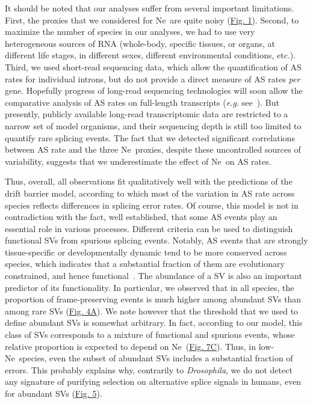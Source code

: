It should be noted that our analyses suffer from several important limitations. First, the proxies that we considered for \acrshort{Ne}~are quite noisy (\hyperref[fig:AS1]{Fig. 1}). Second, to maximize the number of species in our analyses, we had to use very heterogeneous sources of RNA (whole-body, specific tissues, or organs, at different life stages, in different sexes, different environmental conditions, etc.). Third, we used short-read sequencing data, which allow the quantification of AS rates for individual introns, but do not provide a direct measure of AS rates \textit{per} gene. Hopefully progress of long-read sequencing technologies will soon allow the comparative analysis of AS rates on full-length transcripts (\textit{e.g.} see~\cite{leung_full-length_2021}). But presently, publicly available long-read transcriptomic data are restricted to a narrow set of model organisms, and their sequencing depth is still too limited to quantify rare splicing events. The fact that we detected significant correlations between AS rate and the three \acrshort{Ne}~proxies, despite these uncontrolled sources of variability, suggests that we underestimate the effect of \acrshort{Ne}~on AS rates. 

Thus, overall, all observations fit qualitatively well with the predictions of the drift barrier model, according to which most of the variation in AS rate across species reflects differences in splicing error rates. Of course, this model is not in contradiction with the fact, well established, that some AS events play an essential role in various processes. Different criteria can be used to distinguish functional \acrshort{SV}s from spurious splicing events. Notably, AS events that are strongly tissue-specific or developmentally dynamic tend to be more conserved across species, which indicates that a substantial fraction of them are evolutionary constrained, and hence functional~\citep{mudge_origins_2011, barbosa-morais_evolutionary_2012, merkin_evolutionary_2012, reyes_drift_2013}. The abundance of a \acrshort{SV} is also an important predictor of its functionality. In particular, we observed that in all species, the proportion of frame-preserving events is much higher among abundant \acrshort{SV}s than among rare \acrshort{SV}s (\hyperref[fig:AS4]{Fig. 4A}). We note however that the threshold that we used to define abundant \acrshort{SV}s is somewhat arbitrary. In fact, according to our model, this class of \acrshort{SV}s corresponds to a mixture of functional and spurious events, whose relative proportion is expected to depend on \acrshort{Ne}~(\hyperref[fig:AS7]{Fig. 7C}). Thus, in low-\acrshort{Ne}~species, even the subset of abundant \acrshort{SV}s includes a substantial fraction of errors. This probably explains why, contrarily to \textit{Drosophila}, we do not detect any signature of purifying selection on alternative splice signals in humans, even for abundant \acrshort{SV}s (\hyperref[fig:AS5]{Fig. 5}). 

